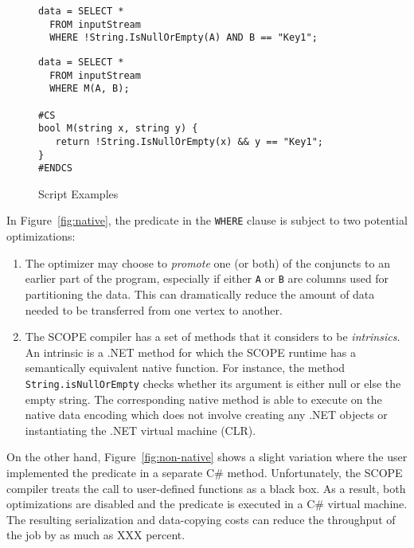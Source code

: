 \begin{figure}[ht]
 \begin{minipage}[b]{\linewidth}
  
   \begin{verbatim}
data = SELECT *
  FROM inputStream
  WHERE !String.IsNullOrEmpty(A) AND B == "Key1";
\end{verbatim}

    \label{fig:native}
  \end{minipage}
  \begin{minipage}[b]{\linewidth}
   \begin{verbatim}
data = SELECT *
  FROM inputStream
  WHERE M(A, B);

#CS
bool M(string x, string y) {
   return !String.IsNullOrEmpty(x) && y == "Key1";
}
#ENDCS
    \end{verbatim}

    \label{fig:non-native}
  \end{minipage}


\caption{Script Examples}
\label{fig:example}
\end{figure}

In Figure~\ref{fig:native}, the predicate in the {\tt WHERE} clause is subject to two potential optimizations:
\begin{enumerate}
\item The optimizer may choose to {\em promote} one (or both) of the conjuncts to an earlier part of the program, especially if either {\tt A} or {\tt B} are columns used for partitioning the data.
This can dramatically reduce the amount of data needed to be transferred from one vertex to another.
\item The SCOPE compiler has a set of methods that it considers to be {\em intrinsics}.
An intrinsic is a .NET method for which the SCOPE runtime has a semantically equivalent native function.
For instance, the method {\tt String.isNullOrEmpty} checks whether its argument is either null or else the empty string.
The corresponding native method is able to execute on the native data encoding which does not involve creating any .NET objects or instantiating the .NET virtual machine (CLR).
\end{enumerate}

On the other hand, Figure~\ref{fig:non-native} shows a slight variation where the user implemented the predicate in a separate C\# method. Unfortunately, the SCOPE compiler treats the call to user-defined functions as a black box. As a result, both optimizations are disabled and the predicate is executed in a C\# virtual machine. The resulting serialization and data-copying costs can reduce the throughput of the job by as much as XXX percent. 


